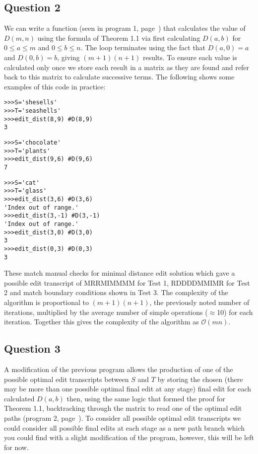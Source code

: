 \documentclass{article}
\begin{document}
\subsection{Question 2}
\vspace{-0.3cm}
We can write a function (seen in program 1, page~\pageref{subsec:Program 1}) that calculates the value of $D(m,n)$ using the formula of Theorem 1.1 via first calculating $D(a,b)$ for $0 \leq a \leq m$ and $0 \leq b \leq n$. The loop terminates using the fact that $D(a,0)=a$ and $D(0,b)=b$, giving $(m+1)(n+1)$ results. To ensure each value is calculated only once we store each result in a matrix as they are found and refer back to this matrix to calculate successive terms. The following shows some examples of this code in practice:

\begin{lstlisting}
>>>S='shesells'
>>>T='seashells'
>>>edit_dist(8,9) #D(8,9)
3
\end{lstlisting}

\begin{lstlisting}
>>>S='chocolate'
>>>T='plants'
>>>edit_dist(9,6) #D(9,6)
7
\end{lstlisting}

\begin{lstlisting}
>>>S='cat'
>>>T='glass'
>>>edit_dist(3,6) #D(3,6)
'Index out of range.'
>>>edit_dist(3,-1) #D(3,-1)
'Index out of range.'
>>>edit_dist(3,0) #D(3,0)
3
>>>edit_dist(0,3) #D(0,3)
3
\end{lstlisting}

These match manual checks for minimal distance edit solution which gave a possible edit transcript of MRRMIMMMM for Test 1, RDDDDMMIMR for Test 2 and match boundary conditions shown in Test 3. The complexity of the algorithm is proportional to $(m+1)(n+1)$, the previously noted number of iterations, multiplied by the average number of simple operations ($\approx$10) for each iteration. Together this gives the complexity of the algorithm as $\mathcal{O} (mn)$.
\vspace{-0.3cm}

\subsection{Question 3}
\vspace{-0.3cm}
A modification of the previous program allows the production of one of the possible optimal edit transcripts between $S$ and $T$ by storing the chosen (there may be more than one possible optimal final edit at any stage) final edit for each calculated $D(a,b)$ then, using the same logic that formed the proof for Theorem 1.1, backtracking through the matrix to read one of the optimal edit paths (program 2, page~\pageref{subsec:Program 2}). To consider all possible optimal edit transcripts we could consider all possible final edits at each stage as a new path branch which you could find with a slight modification of the program, however, this will be left for now. 
\end{document}
